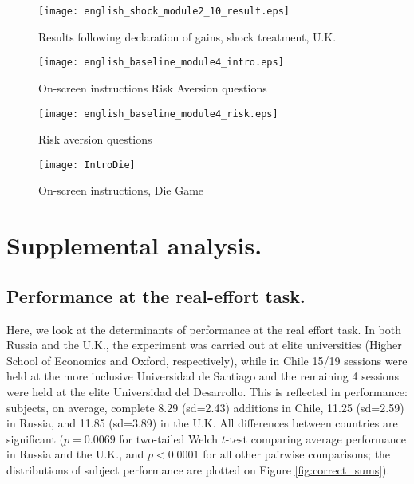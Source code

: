\documentclass[12pt]{article}
\begin{document}
\begin{figure}[ht]
\centerline{\texttt{[image: english\_shock\_module2\_10\_result.eps]}}
\caption{Results following declaration of gains, shock treatment, U.K.}
\end{figure}

\clearpage


\begin{figure}[ht]
\centerline{\texttt{[image: english\_baseline\_module4\_intro.eps]}}
\caption{On-screen instructions Risk Aversion questions}
\label{fig:screen_risk1}
\end{figure}

\vspace{1cm}

\begin{figure}[ht]
\centerline{\texttt{[image: english\_baseline\_module4\_risk.eps]}}
\caption{Risk aversion questions}
\label{fig:screen_risk2}
\end{figure}

\clearpage

\begin{figure}[ht]
\centerline{\texttt{[image: IntroDie]}}
\caption{On-screen instructions, Die Game}
\label{fig:diegame}
\end{figure}
\clearpage



\clearpage
\section{Supplemental analysis.}
\subsection{Performance at the real-effort task. }
\setcounter{table}{0}
\setcounter{figure}{0}
\label{subj_peft}

Here, we look at the determinants of performance at the real effort task.  In both Russia and the U.K., the experiment was carried out at elite universities (Higher School of Economics and Oxford, respectively), while in Chile 15/19 sessions were held at the more inclusive Universidad de Santiago and the remaining  4 sessions were held at the elite Universidad del Desarrollo. This is reflected in performance: subjects, on average, complete 8.29 (sd=2.43) additions in Chile, 11.25 (sd=2.59) in Russia, and 11.85 (sd=3.89) in the U.K. All differences between countries are significant ($p=0.0069$ for two-tailed Welch $t$-test comparing average performance in Russia and the U.K., and $p<0.0001$ for all other pairwise comparisons; the distributions of subject performance are plotted on Figure \ref{fig:correct_sums}).\label{stata:ret}
\end{document}
